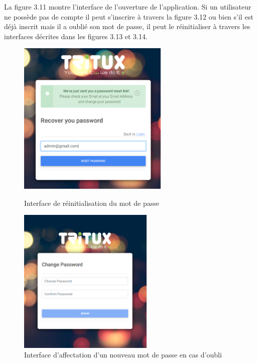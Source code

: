 La figure 3.11 montre l'interface de l'ouverture de l'application. Si un utilisateur ne possède pas de compte il peut s'inscrire à travers la figure 3.12  ou  bien s'il est déjà inscrit mais il a oublié son mot de passe, il peut le réinitialiser à travers les interfaces décrites dans les figures 3.13 et 3.14.

\begin{figure}[!htb]
	\includegraphics[width=\linewidth, height=7.4cm]{reinitmdp.PNG}
	\caption{Interface de réinitialisation du mot de passe }\label{fig: Interface de réinitialisation du mot de passe }
	\endminipage\hfill
	\includegraphics[width=\linewidth, height=7cm]{recoverpass1.PNG}
	\caption{Interface d'affectation d'un nouveau mot de passe en cas d'oubli}\label{fig:Interface d'affectation d'un nouveau mot de passe en cas d'oubli}
	\endminipage\hfill
\end{figure}

